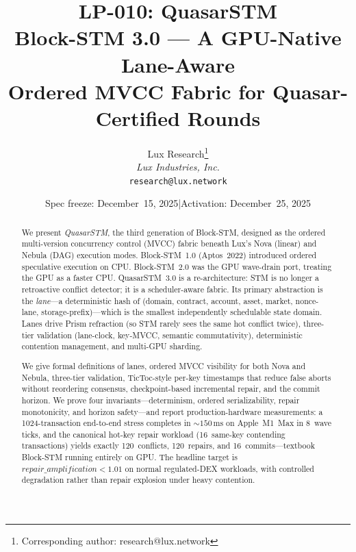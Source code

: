 \documentclass[11pt,a4paper]{article}
\title{LP-010: QuasarSTM\\[4pt]
\large Block-STM 3.0 --- A GPU-Native Lane-Aware\\
Ordered MVCC Fabric for Quasar-Certified Rounds}
\author{
Lux Research\thanks{Corresponding author: research@lux.network}\\
\textit{Lux Industries, Inc.}\\
\texttt{research@lux.network}
}
\date{Spec freeze: December~15, 2025\quad|\quad Activation: December~25, 2025}
\begin{document}
\luxcoverpage

\begin{abstract}
We present \emph{QuasarSTM}, the third generation of Block-STM, designed
as the ordered multi-version concurrency control (MVCC) fabric beneath
Lux's Nova (linear) and Nebula (DAG) execution modes. Block-STM~1.0
(Aptos~2022) introduced ordered speculative execution on CPU.
Block-STM~2.0 was the GPU wave-drain port, treating the GPU as a
faster CPU. QuasarSTM~3.0 is a re-architecture: STM is no longer a
retroactive conflict detector; it is a scheduler-aware fabric. Its
primary abstraction is the \emph{lane}---a deterministic hash of
\textsf{(domain, contract, account, asset, market, nonce-lane,
storage-prefix)}---which is the smallest independently schedulable
state domain. Lanes drive Prism refraction (so STM rarely sees the
same hot conflict twice), three-tier validation (lane-clock, key-MVCC,
semantic commutativity), deterministic contention management, and
multi-GPU sharding.

We give formal definitions of lanes, ordered MVCC visibility for
both Nova and Nebula, three-tier validation, TicToc-style per-key
timestamps that reduce false aborts without reordering consensus,
checkpoint-based incremental repair, and the commit horizon. We
prove four invariants---determinism, ordered serializability, repair
monotonicity, and horizon safety---and report production-hardware
measurements: a 1024-transaction end-to-end stress completes in
${\sim}150\,\text{ms}$ on Apple~M1~Max in 8~wave ticks, and the canonical
hot-key repair workload (16~same-key contending transactions)
yields exactly 120~conflicts, 120~repairs, and 16~commits---textbook
Block-STM running entirely on GPU. The headline target is
$\mathit{repair\_amplification} < 1.01$ on normal regulated-DEX
workloads, with controlled degradation rather than repair explosion
under heavy contention.
\end{abstract}

\tableofcontents
\newpage

















\end{document}
